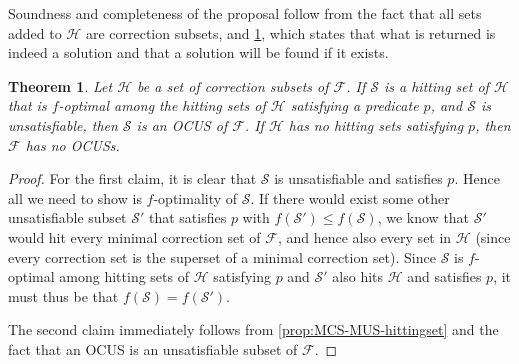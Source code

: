 \documentclass[twoside,11pt]{article}
\newcommand\m[1]{\mathcal{#1}}
\newtheorem{theorem}[thm]{Theorem}
\newcommand\setstohit{\ensuremath{\m{H} }\xspace}
\newcommand\Iend{\ensuremath{I_\mathit{end} }\xspace}
\newcommand\formula{\ensuremath{\m{F} }\xspace}
\begin{document}
Soundness and completeness of the proposal follow from the fact that all sets added to \setstohit are correction subsets, and \cref{thm:soundcomplete}, which states that what is returned is indeed a solution and that a solution will be found if it exists. 



\begin{theorem}\label{thm:soundcomplete}
Let $\m{H}$ be a set of correction subsets of \formula. 
If $\m{S}$ is a hitting set of $\m{H}$ that is $f$-optimal among the hitting sets of $\m{H}$ satisfying a predicate $p$, and  $\m{S}$ is unsatisfiable, then $\m{S}$ is an OCUS of $\formula$. 
If  $\m{H}$ has no hitting sets satisfying $p$, then $\formula$ has no OCUSs.
\end{theorem}
\begin{proof}
For the first claim, it is clear that $\m{S}$ is unsatisfiable and satisfies $p$. Hence all we need to show is $f$-optimality of $\m{S}$.
If there would exist some other unsatisfiable subset $\m{S}'$ that satisfies $p$ with $f(\m{S}')\leq f(\m{S})$, we know that $\m{S}'$ would hit every minimal correction set of $\m{F}$, and hence also every set in $\m{H}$ (since every correction set is the superset of a minimal correction set).
Since $\m{S}$ is $f$-optimal among hitting sets of $\m{H}$ satisfying $p$ and $\m{S}'$ also hits $\m{H}$ and satisfies $p$, it must thus be that $f(\m{S})=f(\m{S}')$. 
%  
		
The second claim immediately follows from \cref{prop:MCS-MUS-hittingset} and the fact that an OCUS is an unsatisfiable subset of $\formula$. 
\end{proof}
% 
\end{document}
